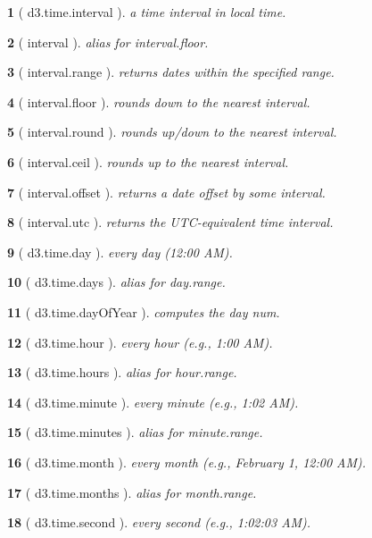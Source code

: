 \documentclass[10pt,landscape,letterpaper]{article}
\newcounter{thm}
\theoremstyle{mytheoremstyle}
\newtheorem*{thm}{}
\begin{document}
\begin{multicols}{3}
\begin{thm} [ d3.time.interval ]  a time interval in local time.
\end{thm}\begin{thm} [ interval ]  alias for interval.floor.
\end{thm}\begin{thm} [ interval.range ]  returns dates within the specified range.
\end{thm}\begin{thm} [ interval.floor ]  rounds down to the nearest interval.
\end{thm}\begin{thm} [ interval.round ]  rounds up/down to the nearest interval.
\end{thm}\begin{thm} [ interval.ceil ]  rounds up to the nearest interval.
\end{thm}\begin{thm} [ interval.offset ]  returns a date offset by some interval.
\end{thm}\begin{thm} [ interval.utc ]  returns the UTC-equivalent time interval.
\end{thm}\begin{thm} [ d3.time.day ]  every day (12:00 AM).
\end{thm}\begin{thm} [ d3.time.days ]  alias for day.range.
\end{thm}\begin{thm} [ d3.time.dayOfYear ]  computes the day num.
\end{thm}\begin{thm} [ d3.time.hour ]  every hour (e.g., 1:00 AM).
\end{thm}\begin{thm} [ d3.time.hours ]  alias for hour.range.
\end{thm}\begin{thm} [ d3.time.minute ]  every minute (e.g., 1:02 AM).
\end{thm}\begin{thm} [ d3.time.minutes ]  alias for minute.range.
\end{thm}\begin{thm} [ d3.time.month ]  every month (e.g., February 1, 12:00 AM).
\end{thm}\begin{thm} [ d3.time.months ]  alias for month.range.
\end{thm}\begin{thm} [ d3.time.second ]  every second (e.g., 1:02:03 AM).

\end{thm}
\end{multicols}
\end{document}
